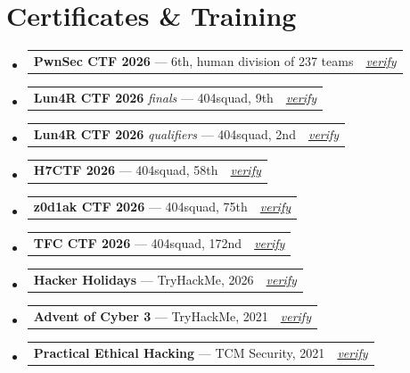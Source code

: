 \documentclass[letterpaper,11pt]{article}
\makeatletter
\newcommand{\resumeEntry}[2]{%
  \item
  \begin{tabular*}{\linewidth}{@{}l@{\extracolsep{\fill}}r@{}}
    #1 & \textit{\small #2} \\
  \end{tabular*}\vspace{-6pt}%
}
\newcommand{\resumeSubHeadingListStart}{\begin{itemize}[leftmargin=0.15in, label={}]}
\newcommand{\resumeSubHeadingListEnd}{\end{itemize}}
\makeatother
\begin{document}
\section{Certificates \& Training}
  \resumeSubHeadingListStart
    \resumeEntry{\textbf{PwnSec CTF 2026} --- 6th, human division of 237 teams}{\href{https://github.com/aaadarsh1337/cybersecurity-achievements/blob/main/PwnSec/006_404squad.pdf}{verify}}
    \resumeEntry{\textbf{Lun4R CTF 2026} \emph{finals} --- 404squad, 9th}{\href{https://github.com/aaadarsh1337/cybersecurity-achievements/blob/main/Lun4R-finals/Adarsh\%20Pillai\%20(404squad).pdf}{verify}}
    \resumeEntry{\textbf{Lun4R CTF 2026} \emph{qualifiers} --- 404squad, 2nd}{\href{https://github.com/aaadarsh1337/cybersecurity-achievements/blob/main/Lun4R-quals/LUN4R_CTF_2026_Certificate_Adarsh_Pillai.jpg}{verify}}
    \resumeEntry{\textbf{H7CTF 2026} --- 404squad, 58th}{\href{https://github.com/aaadarsh1337/cybersecurity-achievements/blob/main/H7CTF/certificate_H7CTF26-46VN-V3V2-32HK.png}{verify}}
    \resumeEntry{\textbf{z0d1ak CTF 2026} --- 404squad, 75th}{\href{https://github.com/aaadarsh1337/cybersecurity-achievements/blob/main/z0d1ak-ctf/z0d1ak-certificate-adarsh-pillai.pdf}{verify}}
    \resumeEntry{\textbf{TFC CTF 2026} --- 404squad, 172nd}{\href{https://github.com/aaadarsh1337/cybersecurity-achievements/blob/main/TFCCTF/tfc-ctf-26-diploma-adarsh-pillai.png}{verify}}
    \resumeEntry{\textbf{Hacker Holidays} --- TryHackMe, 2026}{\href{https://tryhackme-certificates.s3-eu-west-1.amazonaws.com/THM-THCFDTXKFZ.pdf}{verify}}
    \resumeEntry{\textbf{Advent of Cyber 3} --- TryHackMe, 2021}{\href{https://tryhackme-certificates.s3-eu-west-1.amazonaws.com/THM-KMESEDNQTS.pdf}{verify}}
    \resumeEntry{\textbf{Practical Ethical Hacking} --- TCM Security, 2021}{\href{https://www.udemy.com/certificate/UC-17b88a43-ad89-4b6a-a73a-ce3f22cdc753/}{verify}}
  \resumeSubHeadingListEnd
\end{document}
